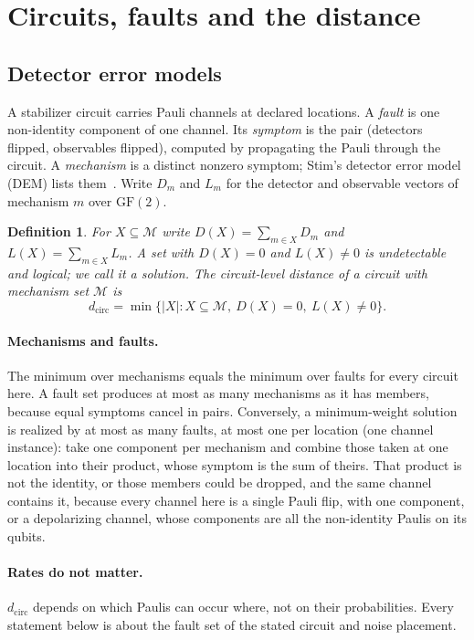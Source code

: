 \documentclass[aps,pra,twocolumn,superscriptaddress,nofootinbib,longbibliography,floatfix]{revtex4-2}
\newtheorem{definition}{Definition}
\newcommand{\GF}{\mathrm{GF}(2)}
\newcommand{\dc}{d_{\mathrm{circ}}}
\begin{document}
\section{Circuits, faults and the distance}
\label{sec:setting}

\subsection{Detector error models}

A stabilizer circuit carries Pauli channels at declared locations. A \emph{fault} is one non-identity component of one channel. Its \emph{symptom} is the pair (detectors flipped, observables flipped), computed by propagating the Pauli through the circuit. A \emph{mechanism} is a distinct nonzero symptom; Stim's detector error model (DEM) lists them~\cite{gidney2021stim}. Write $D_m$ and $L_m$ for the detector and observable vectors of mechanism $m$ over $\GF$.

\begin{definition}
For $X\subseteq\mathcal M$ write $D(X)=\sum_{m\in X}D_m$ and $L(X)=\sum_{m\in X}L_m$. A set with $D(X)=0$ and $L(X)\ne0$ is \emph{undetectable and logical}; we call it a \emph{solution}. The circuit-level distance of a circuit with mechanism set $\mathcal M$ is
\[
\dc=\min\{|X| : X\subseteq\mathcal M,\ D(X)=0,\ L(X)\neq0\}.
\]
\end{definition}

\paragraph*{Mechanisms and faults.} The minimum over mechanisms equals the minimum over faults for every circuit here. A fault set produces at most as many mechanisms as it has members, because equal symptoms cancel in pairs. Conversely, a minimum-weight solution is realized by at most as many faults, at most one per location (one channel instance): take one component per mechanism and combine those taken at one location into their product, whose symptom is the sum of theirs. That product is not the identity, or those members could be dropped, and the same channel contains it, because every channel here is a single Pauli flip, with one component, or a depolarizing channel, whose components are all the non-identity Paulis on its qubits.

\paragraph*{Rates do not matter.} $\dc$ depends on which Paulis can occur where, not on their probabilities. Every statement below is about the fault set of the stated circuit and noise placement.
\end{document}
